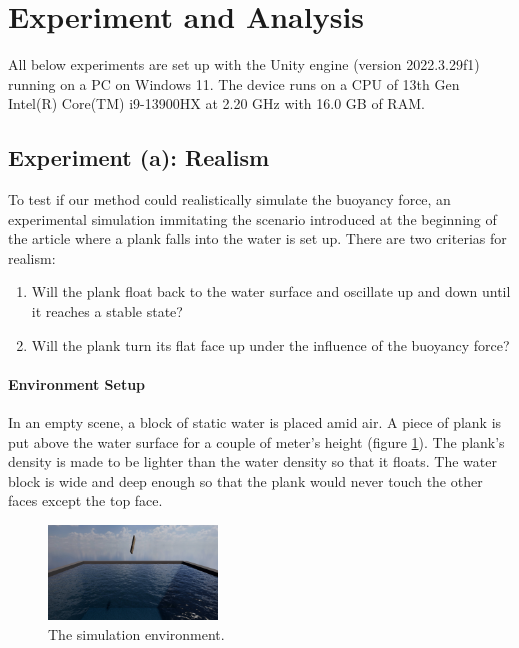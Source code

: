 \section{Experiment and Analysis}

All below experiments are set up with the Unity engine (version 2022.3.29f1) running on a PC on Windows 11.
The device runs on a CPU of 13th Gen Intel(R) Core(TM) i9-13900HX at 2.20 GHz with 16.0 GB of RAM.

\subsection*{Experiment (a): Realism}

To test if our method could realistically simulate the buoyancy force, an experimental simulation immitating the scenario introduced at the beginning of the article where a plank falls into the water is set up.
There are two criterias for realism:
\begin{enumerate}
	\item Will the plank float back to the water surface and oscillate up and down until it reaches a stable state?
	\item Will the plank turn its flat face up under the influence of the buoyancy force?
\end{enumerate}

\paragraph*{Environment Setup}

In an empty scene, a block of static water is placed amid air.
A piece of plank is put above the water surface for a couple of meter's height (figure \ref{simulation-environment}).
The plank's density is made to be lighter than the water density so that it floats.
The water block is wide and deep enough so that the plank would never touch the other faces except the top face.

\begin{figure}[h]
	\centering
	\includegraphics[width=0.4\textwidth]{../Thesis/figures/experiment-environment.jpg}
	\caption{The simulation environment.}
	\label{simulation-environment}
\end{figure}

